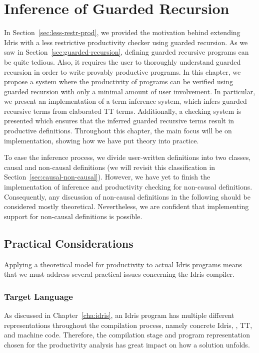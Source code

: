 \chapter{Inference of Guarded Recursion}
\label{cha:infer-guard-recurs}
In Section~\ref{sec:less-restr-prod}, we provided the motivation behind
extending Idris with a less restrictive productivity checker using guarded
recursion. As we saw in Section~\ref{sec:guarded-recursion}, defining guarded
recursive programs can be quite tedious. Also, it requires the user to
thoroughly understand guarded recursion in order to write provably productive
programs. In this chapter, we propose a system where the productivity of
programs can be verified using guarded recursion with only a minimal amount of
user involvement. In particular, we present an implementation of a term
inference system, which infers guarded recursive terms from elaborated TT
terms. Additionally, a checking system is presented which ensures that the
inferred guarded recursive terms result in productive definitions. Throughout
this chapter, the main focus will be on implementation, showing how we have put
theory into practice.

To ease the inference process, we divide user-written definitions into two
classes, causal and non-causal definitions (we will revisit this classification
in Section~\ref{sec:causal-non-causal}). However, we have yet to finish the
implementation of inference and productivity checking for non-causal
definitions. Consequently, any discussion of non-causal definitions in the following
should be considered mostly theoretical. Nevertheless, we are confident that
implementing support for non-causal definitions is possible.

\section{Practical Considerations}
Applying a theoretical model for productivity to actual Idris programs means
that we must address several practical issues concerning the Idris compiler.

\subsection{Target Language}
As discussed in Chapter~\ref{cha:idris}, an Idris program has multiple different
representations throughout the compilation process, namely concrete Idris,
\IdrisM{}, TT, and machine code. Therefore, the compilation
stage and program representation chosen for the productivity analysis has great
impact on how a solution unfolds.

